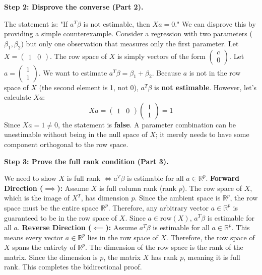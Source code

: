 \begin{solution}
\textbf{Step 2: Disprove the converse (Part 2).}

The statement is: "If $a^T \beta$ is not estimable, then $Xa = 0$." We can disprove this by providing a simple counterexample.
Consider a regression with two parameters ($\beta_1, \beta_2$) but only one observation that measures only the first parameter.
Let $X = \begin{pmatrix} 1 & 0 \end{pmatrix}$. The row space of $X$ is simply vectors of the form $\begin{pmatrix} c \\ 0 \end{pmatrix}$.
Let $a = \begin{pmatrix} 1 \\ 1 \end{pmatrix}$. We want to estimate $a^T \beta = \beta_1 + \beta_2$.
Because $a$ is not in the row space of $X$ (the second element is 1, not 0), $a^T \beta$ is \textbf{not estimable}.
However, let's calculate $Xa$:
\[ Xa = \begin{pmatrix} 1 & 0 \end{pmatrix} \begin{pmatrix} 1 \\ 1 \end{pmatrix} = 1 \]
Since $Xa = 1 \neq 0$, the statement is \textbf{false}. A parameter combination can be unestimable without being in the null space of $X$; it merely needs to have some component orthogonal to the row space.

\textbf{Step 3: Prove the full rank condition (Part 3).}

We need to show $X$ is full rank $\iff a^T \beta$ is estimable for all $a \in \mathbb{R}^p$.
\textbf{Forward Direction ($\implies$):}
Assume $X$ is full column rank (rank $p$).
The row space of $X$, which is the image of $X^T$, has dimension $p$.
Since the ambient space is $\mathbb{R}^p$, the row space must be the entire space $\mathbb{R}^p$.
Therefore, any arbitrary vector $a \in \mathbb{R}^p$ is guaranteed to be in the row space of $X$.
Since $a \in \text{row}(X)$, $a^T \beta$ is estimable for all $a$.
\textbf{Reverse Direction ($\impliedby$):}
Assume $a^T \beta$ is estimable for all $a \in \mathbb{R}^p$.
This means every vector $a \in \mathbb{R}^p$ lies in the row space of $X$.
Therefore, the row space of $X$ spans the entirety of $\mathbb{R}^p$.
The dimension of the row space is the rank of the matrix. Since the dimension is $p$, the matrix $X$ has rank $p$, meaning it is full rank.
This completes the bidirectional proof.
\end{solution}

